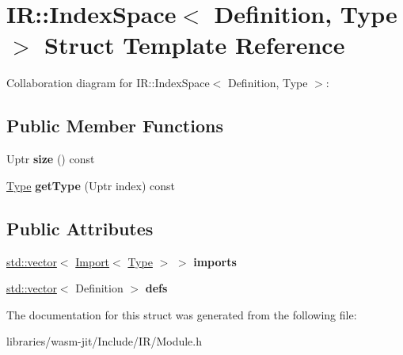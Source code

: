 \hypertarget{struct_i_r_1_1_index_space}{}\section{IR\+:\+:Index\+Space$<$ Definition, Type $>$ Struct Template Reference}
\label{struct_i_r_1_1_index_space}


Collaboration diagram for IR\+:\+:Index\+Space$<$ Definition, Type $>$\+:
\subsection*{Public Member Functions}
\begin{DoxyCompactItemize}
\item 
\mbox{\label{struct_i_r_1_1_index_space_acfa4fb37a2718a140eb1d63d11114379}} 
Uptr {\bfseries size} () const
\item 
\mbox{\label{struct_i_r_1_1_index_space_a63f9f37ae170f21df54cc27ef4357577}} 
\mbox{\hyperlink{struct_type}{Type}} {\bfseries get\+Type} (Uptr index) const
\end{DoxyCompactItemize}
\subsection*{Public Attributes}
\begin{DoxyCompactItemize}
\item 
\mbox{\label{struct_i_r_1_1_index_space_af7ac0286fd28c2a0b2357798b8a8b271}} 
\mbox{\hyperlink{classstd_1_1vector}{std\+::vector}}$<$ \mbox{\hyperlink{struct_i_r_1_1_import}{Import}}$<$ \mbox{\hyperlink{struct_type}{Type}} $>$ $>$ {\bfseries imports}
\item 
\mbox{\label{struct_i_r_1_1_index_space_adebd6a6fe73b7fc49c99553da844088b}} 
\mbox{\hyperlink{classstd_1_1vector}{std\+::vector}}$<$ Definition $>$ {\bfseries defs}
\end{DoxyCompactItemize}


The documentation for this struct was generated from the following file\+:\begin{DoxyCompactItemize}
\item 
libraries/wasm-\/jit/\+Include/\+I\+R/Module.\+h\end{DoxyCompactItemize}
